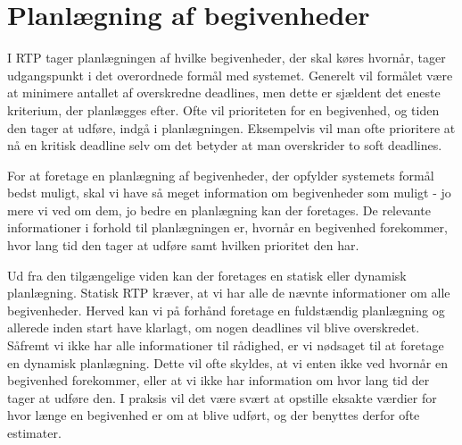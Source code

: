 \section{Planlægning af begivenheder}
I RTP tager planlægningen af hvilke begivenheder, der skal køres hvornår, tager udgangspunkt i det overordnede formål med systemet. Generelt vil formålet være at minimere antallet af overskredne deadlines, men dette er sjældent det eneste kriterium, der planlægges efter. Ofte vil prioriteten for en begivenhed, og tiden den tager at udføre, indgå i planlægningen. Eksempelvis vil man ofte prioritere at nå en kritisk deadline selv om det betyder at man overskrider to soft deadlines. 


For at foretage en planlægning af begivenheder, der opfylder systemets formål bedst muligt, skal vi have så meget information om begivenheder som muligt - jo mere vi ved om dem, jo bedre en planlægning kan der foretages. De relevante informationer i forhold til planlægningen er, hvornår en begivenhed forekommer, hvor lang tid den tager at udføre samt hvilken prioritet den har. 

Ud fra den tilgængelige viden kan der foretages en statisk eller dynamisk planlægning\cite{cheng1987scheduling}. Statisk RTP kræver, at vi har alle de nævnte informationer om alle begivenheder. Herved kan vi på forhånd foretage en fuldstændig planlægning og allerede inden start have klarlagt, om nogen deadlines vil blive overskredet. Såfremt vi ikke har alle informationer til rådighed, er vi nødsaget til at foretage en dynamisk planlægning. Dette vil ofte skyldes, at vi enten ikke ved hvornår en begivenhed forekommer, eller at vi ikke har information om hvor lang tid der tager at udføre den. I praksis vil det være svært at opstille eksakte værdier for hvor længe en begivenhed er om at blive udført, og der benyttes derfor ofte estimater. 

